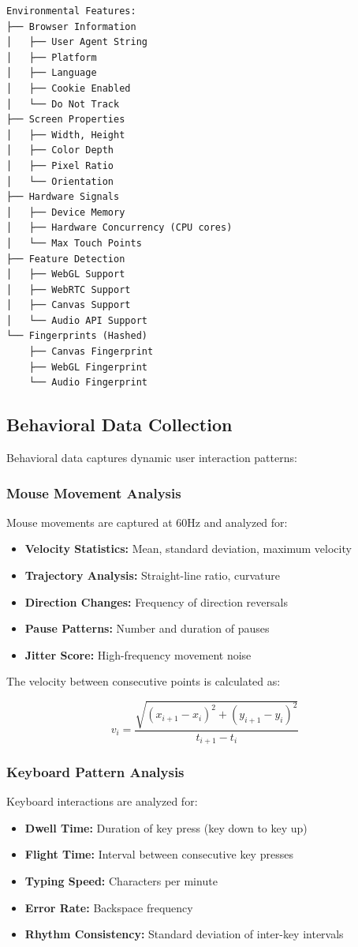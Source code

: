 \begin{verbatim}
Environmental Features:
├── Browser Information
│   ├── User Agent String
│   ├── Platform
│   ├── Language
│   ├── Cookie Enabled
│   └── Do Not Track
├── Screen Properties
│   ├── Width, Height
│   ├── Color Depth
│   ├── Pixel Ratio
│   └── Orientation
├── Hardware Signals
│   ├── Device Memory
│   ├── Hardware Concurrency (CPU cores)
│   └── Max Touch Points
├── Feature Detection
│   ├── WebGL Support
│   ├── WebRTC Support
│   ├── Canvas Support
│   └── Audio API Support
└── Fingerprints (Hashed)
    ├── Canvas Fingerprint
    ├── WebGL Fingerprint
    └── Audio Fingerprint
\end{verbatim}

\subsection{Behavioral Data Collection}

Behavioral data captures dynamic user interaction patterns:

\subsubsection{Mouse Movement Analysis}

Mouse movements are captured at 60Hz and analyzed for:
\begin{itemize}
    \item \textbf{Velocity Statistics:} Mean, standard deviation, maximum velocity
    \item \textbf{Trajectory Analysis:} Straight-line ratio, curvature
    \item \textbf{Direction Changes:} Frequency of direction reversals
    \item \textbf{Pause Patterns:} Number and duration of pauses
    \item \textbf{Jitter Score:} High-frequency movement noise
\end{itemize}

The velocity between consecutive points is calculated as:

$$v_i = \frac{\sqrt{(x_{i+1} - x_i)^2 + (y_{i+1} - y_i)^2}}{t_{i+1} - t_i}$$

\subsubsection{Keyboard Pattern Analysis}

Keyboard interactions are analyzed for:
\begin{itemize}
    \item \textbf{Dwell Time:} Duration of key press (key down to key up)
    \item \textbf{Flight Time:} Interval between consecutive key presses
    \item \textbf{Typing Speed:} Characters per minute
    \item \textbf{Error Rate:} Backspace frequency
    \item \textbf{Rhythm Consistency:} Standard deviation of inter-key intervals
\end{itemize}

